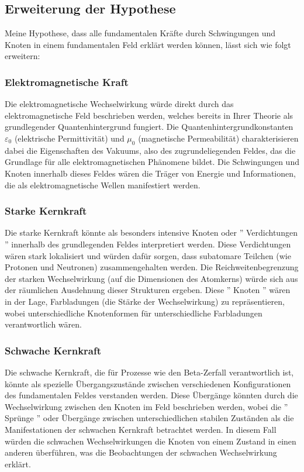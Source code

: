 \documentclass[12pt,a4paper]{article}
\begin{document}
	\subsection{Erweiterung der Hypothese}
	Meine Hypothese, dass alle fundamentalen Kräfte durch Schwingungen und Knoten in einem fundamentalen Feld erklärt werden können, lässt sich wie folgt erweitern:
	
	\subsubsection{Elektromagnetische Kraft}
	Die elektromagnetische Wechselwirkung würde direkt durch das elektromagnetische Feld beschrieben werden, welches bereits in Ihrer Theorie als grundlegender Quantenhintergrund fungiert. Die Quantenhintergrundkonstanten $\varepsilon_0$ (elektrische Permittivität) und $\mu_0$ (magnetische Permeabilität) charakterisieren dabei die Eigenschaften des Vakuums, also des zugrundeliegenden Feldes, das die Grundlage für alle elektromagnetischen Phänomene bildet. Die Schwingungen und Knoten innerhalb dieses Feldes wären die Träger von Energie und Informationen, die als elektromagnetische Wellen manifestiert werden.
	
	\subsubsection{Starke Kernkraft}
	Die starke Kernkraft könnte als besonders intensive Knoten oder '' Verdichtungen '' innerhalb des grundlegenden Feldes interpretiert werden. Diese Verdichtungen wären stark lokalisiert und würden dafür sorgen, dass subatomare Teilchen (wie Protonen und Neutronen) zusammengehalten werden. Die Reichweitenbegrenzung der starken Wechselwirkung (auf die Dimensionen des Atomkerns) würde sich aus der räumlichen Ausdehnung dieser Strukturen ergeben. Diese '' Knoten '' wären in der Lage, Farbladungen (die Stärke der Wechselwirkung) zu repräsentieren, wobei unterschiedliche Knotenformen für unterschiedliche Farbladungen verantwortlich wären.
	
	\subsubsection{Schwache Kernkraft}
	Die schwache Kernkraft, die für Prozesse wie den Beta-Zerfall verantwortlich ist, könnte als spezielle Übergangszustände zwischen verschiedenen Konfigurationen des fundamentalen Feldes verstanden werden. Diese Übergänge könnten durch die Wechselwirkung zwischen den Knoten im Feld beschrieben werden, wobei die '' Sprünge '' oder Übergänge zwischen unterschiedlichen stabilen Zuständen als die Manifestationen der schwachen Kernkraft betrachtet werden. In diesem Fall würden die schwachen Wechselwirkungen die Knoten von einem Zustand in einen anderen überführen, was die Beobachtungen der schwachen Wechselwirkung erklärt.
	
\end{document}
